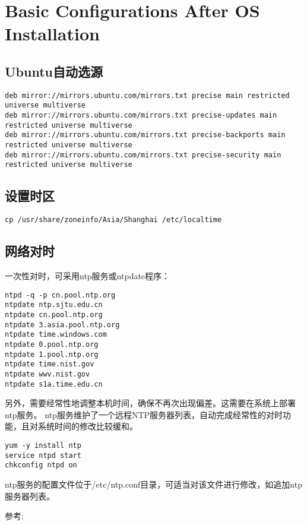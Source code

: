 
\section{Basic Configurations After OS Installation}


\subsection{Ubuntu自动选源}
\begin{verbatim}
deb mirror://mirrors.ubuntu.com/mirrors.txt precise main restricted universe multiverse
deb mirror://mirrors.ubuntu.com/mirrors.txt precise-updates main restricted universe multiverse
deb mirror://mirrors.ubuntu.com/mirrors.txt precise-backports main restricted universe multiverse
deb mirror://mirrors.ubuntu.com/mirrors.txt precise-security main restricted universe multiverse
\end{verbatim}

\subsection{设置时区}
\begin{verbatim}
cp /usr/share/zoneinfo/Asia/Shanghai /etc/localtime 
\end{verbatim}

\subsection{网络对时}
一次性对时，可采用ntp服务或ntpdate程序：
\begin{verbatim}
ntpd -q -p cn.pool.ntp.org
ntpdate ntp.sjtu.edu.cn
ntpdate cn.pool.ntp.org
ntpdate 3.asia.pool.ntp.org
ntpdate time.windows.com
ntpdate 0.pool.ntp.org
ntpdate 1.pool.ntp.org
ntpdate time.nist.gov
ntpdate wwv.nist.gov
ntpdate s1a.time.edu.cn 
\end{verbatim}

另外，需要经常性地调整本机时间，确保不再次出现偏差。这需要在系统上部署ntp服务。
ntp服务维护了一个远程NTP服务器列表，自动完成经常性的对时功能，且对系统时间的修改比较缓和。

\begin{verbatim}
yum -y install ntp
service ntpd start
chkconfig ntpd on
\end{verbatim}

ntp服务的配置文件位于/etc/ntp.conf目录，可适当对该文件进行修改，如追加ntp服务器列表。

参考:

